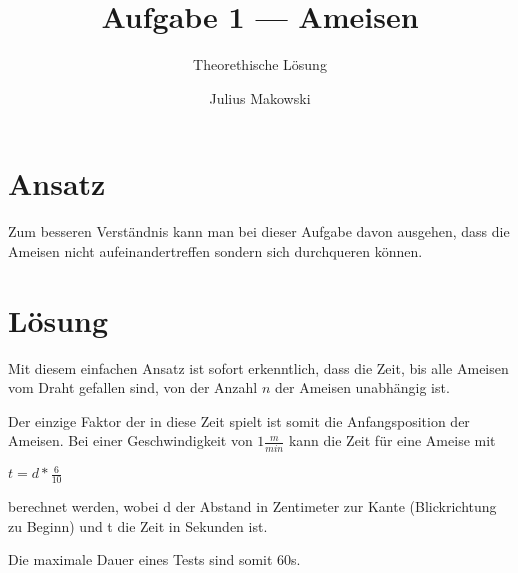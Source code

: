 \documentclass[12pt]{scrartcl}
\title{Aufgabe 1 --- Ameisen}
\subtitle{Theorethische L\"osung}
\author{Julius Makowski}
\date{}
\begin{document}
  \maketitle

  \section{Ansatz}
    Zum besseren Verst{\"a}ndnis kann man bei dieser Aufgabe davon ausgehen, dass die Ameisen nicht aufeinandertreffen sondern sich durchqueren k{\"o}nnen.

  \section{L{\"o}sung}
    Mit diesem einfachen Ansatz ist sofort erkenntlich, dass die Zeit, bis alle Ameisen vom Draht gefallen sind, von der Anzahl \(n\) der Ameisen unabh{\"a}ngig ist.

    \vspace{12pt}\noindent
    Der einzige Faktor der in diese Zeit spielt ist somit die Anfangsposition der Ameisen. Bei einer Geschwindigkeit von \(1\frac{m}{min}\) kann die Zeit f{\"u}r eine Ameise mit

    \vspace{12pt}
    \(t = d * \frac{6}{10}\)

    \vspace{12pt}\noindent
    berechnet werden, wobei d der Abstand in Zentimeter zur Kante (Blickrichtung zu Beginn) und t die Zeit in Sekunden ist.

    \vspace{12pt}\noindent
    Die maximale Dauer eines Tests sind somit 60s.
\end{document}
